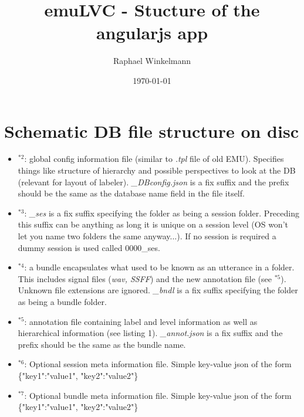 \documentclass[A4,12pt, utf8]{article}
\title{emuLVC - Stucture of the angularjs app}
\author{Raphael Winkelmann}
\date{\today}
\newcounter{treeline}
\newcommand{\treeroot}[1]{%
\node[above] at (0,0) {#1};%
\setcounter{treeline}{0}
}
\newcommand{\altentry}[2]{%
\draw[->] (#2-1,-\value{treeline}/2) -- (#2-1,-\value{treeline}/2-0.5) -- (#2+0.5,-\value{treeline}/2-0.5) node[right] {#1};
\foreach \x in {1,...,#2}
{   \draw (\x-1,-\value{treeline}/2) -- (\x-1,-\value{treeline}/2-0.5);
}
\stepcounter{treeline}
}
\begin{document}

\section{Schematic DB file structure on disc}



\begin{itemize}
  \item $^{*2}$: global config information file (similar to \textit{.tpl} file of old EMU). Specifies things like structure of hierarchy and possible perspectives to look at the DB (relevant for layout of labeler). \textit{\_DBconfig.json} is a fix suffix and the prefix should be the same as the database name field in the file itself.
  \item $^{*3}$: \textit{\_ses} is a fix suffix specifying the folder as being a session folder. Preceding this suffix can be anything as long it is unique on a session level (OS won't let you name two folders the same anyway...). If no session is required a dummy session is used called 0000\_ses.
  \item $^{*4}$: a bundle encapsulates what used to be known as an utterance in a folder. This includes signal files (\textit{wav, SSFF}) and the new annotation file (see $^{*5}$). Unknown file extensions are ignored. \textit{\_bndl} is a fix suffix specifying the folder as being a bundle folder.
  \item $^{*5}$: annotation file containing label and level information as well as hierarchical information (see listing 1). \textit{\_annot.json} is a fix suffix and the prefix should be the same as the bundle name.
  \item $^{*6}$: Optional session meta information file. Simple key-value json of the form \{"key1":"value1", "key2":"value2"\}
  \item $^{*7}$: Optional bundle meta information file. Simple key-value json of the form \{"key1":"value1", "key2":"value2"\}
\end{itemize}
\end{document}
